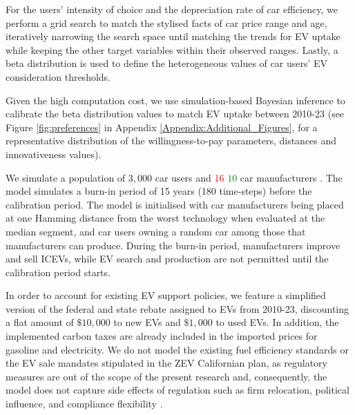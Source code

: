 \documentclass[12pt]{article}
\begin{document}
	For the users' intensity of choice and the depreciation rate of car efficiency, we perform a grid search to match the stylised facts of car price range and age, iteratively narrowing the search space until matching the trends for EV uptake while keeping the other target variables within their observed ranges. Lastly, a beta distribution is used to define the heterogeneous values of car users' EV consideration thresholds.
    
    Given the high computation cost, we use simulation-based Bayesian inference \citep{papamakarios2016fast,cranmer2020frontier, dyer2024black} to calibrate the beta distribution values to match EV uptake between 2010-23 (see Figure \ref{fig:preferences} in Appendix \ref{Appendix:Additional_Figures}, for a representative distribution of the willingness-to-pay parameters, distances and innovativeness values). %
	
	We simulate a population of $3,000$ car users and \textcolor{red}{16} \textcolor{green}{$10$} car manufacturers \citep{Grieco2024MarketPower}. The model simulates a burn-in period of 15 years (180 time-steps) before the calibration period. The model is initialised with car manufacturers being placed at one Hamming distance from the worst technology when evaluated at the median segment, and car users owning a random car among those that manufacturers can produce. During the burn-in period, manufacturers improve and sell ICEVs, while EV search and production are not permitted until the calibration period starts.   
	
	In order to account for existing EV support policies, we feature a simplified version of the federal and state rebate assigned to EVs \citep{CARB1990LEV, CARB1990hearing,CARB1990proposed} from 2010-23, discounting a flat amount of $\$10,000$ to new EVs and $\$1,000$ to used EVs. In addition, the implemented carbon taxes are already included in the imported prices for gasoline and electricity. We do not model the existing fuel efficiency standards or the EV sale mandates stipulated in the ZEV Californian plan, as regulatory measures are out of the scope of the present research and, consequently, the model does not capture side effects of regulation such as firm relocation, political influence, and compliance flexibility \citep{Wesseling2014Political,wesseling2015exploring}.   
	
\end{document}

